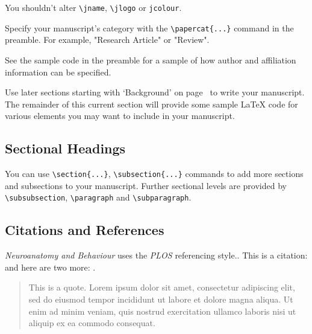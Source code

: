 \documentclass[a4paper,num-refs]{ehi-journals}
\begin{document}
You shouldn't alter \verb|\jname|, \verb|\jlogo| or \verb|jcolour|.

Specify your manuscript's category with the \verb|\papercat{...}| command in the preamble. For example, "Research Article" or "Review".

See the sample code in the preamble for a sample of how author and affiliation information can be specified.

Use later sections starting with `Background' on page~\pageref{sec:background} to write your manuscript. The remainder of this current section will provide some sample \LaTeX{} code for various elements you may want to include in your manuscript.

\subsection{Sectional Headings}
You can use \verb|\section{...}|, \verb|\subsection{...}| commands to add more sections and subsections to your manuscript. Further sectional levels are provided by \verb|\subsubsection|, \verb|\paragraph| and \verb|\subparagraph|.

\subsection{Citations and References}
\emph{Neuroanatomy and Behaviour} uses the \emph{PLOS} referencing style..
This is a citation: \cite{Fan:2004} and here are two more: \cite{Cox:1972,Hear:Holm:Step:quan:2006}.

\begin{quote}
This is a quote. Lorem ipsum dolor sit amet, consectetur adipiscing elit, sed do eiusmod tempor incididunt ut labore et dolore magna aliqua. Ut enim ad minim veniam, quis nostrud exercitation ullamco laboris nisi ut aliquip ex ea commodo consequat. 
\end{quote}
\end{document}

